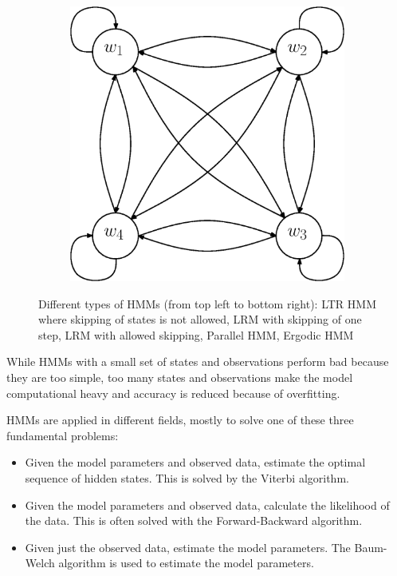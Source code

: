 \documentclass[a4paper, oneside]{csthesis}
\begin{document}
\begin{figure}
        \begin{subfigure}[b]{0.30\textwidth}
                \centering
                \includegraphics[width=\textwidth]{figures/hmm-ltr4.eps}
                \label{fig:hmm1}
        \end{subfigure}%



        \caption{Different types of HMMs (from top left to bottom right): LTR HMM where skipping of states is not allowed, LRM with skipping of one step, LRM with allowed skipping, Parallel HMM, Ergodic HMM}\label{fig:markov-models}
\end{figure}



While HMMs with a small set of states and observations perform bad because they are too simple, too many states and observations make the model computational heavy and accuracy is reduced because of overfitting.

HMMs are applied in different fields, mostly to solve one of these three fundamental problems:
\begin{itemize}
\item Given the model parameters and observed data, estimate the optimal sequence of hidden states. This is solved by the Viterbi algorithm.
\item Given the model parameters and observed data, calculate the likelihood of the data. This is often solved with the Forward-Backward algorithm.
\item Given just the observed data, estimate the model parameters. The Baum-Welch algorithm is used to estimate the model parameters.
\end{itemize}
\end{document}

